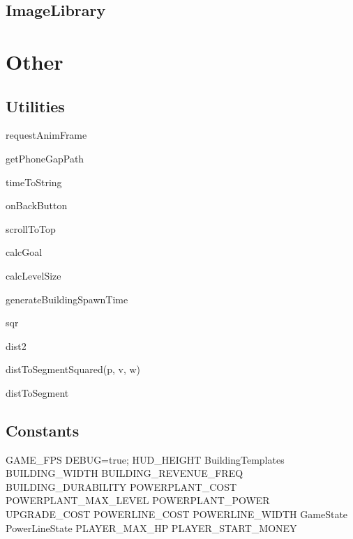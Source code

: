 	\subsection*{ImageLibrary}

	\clearpage

\section{Other}

\subsection*{Utilities}

	requestAnimFrame

	getPhoneGapPath

	timeToString

	onBackButton

	scrollToTop

	calcGoal

	calcLevelSize

	generateBuildingSpawnTime

	sqr

	dist2

	distToSegmentSquared(p, v, w)

	distToSegment


\subsection*{Constants}
	
	GAME_FPS
	DEBUG=true;
	HUD_HEIGHT
	BuildingTemplates
	BUILDING_WIDTH
	BUILDING_REVENUE_FREQ
	BUILDING_DURABILITY
	POWERPLANT_COST
	POWERPLANT_MAX_LEVEL
	POWERPLANT_POWER
	UPGRADE_COST
	POWERLINE_COST
	POWERLINE_WIDTH
	GameState
	PowerLineState
	PLAYER_MAX_HP
	PLAYER_START_MONEY
